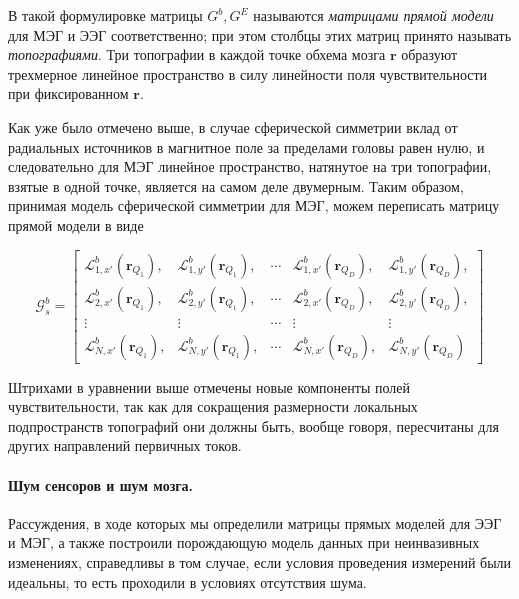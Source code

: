 В такой формулировке матрицы $G^b, G^E$ называются \emph{матрицами прямой модели} для МЭГ и ЭЭГ соответственно;
при этом столбцы этих матриц принято называть \emph{топографиями}. Три топографии в каждой точке обхема мозга $\mathbf{r}$
образуют трехмерное линейное пространство в силу линейности поля чувствительности при фиксированном $\mathbf{r}$.

Как уже было отмечено выше, в случае сферической симметрии вклад от радиальных источников в магнитное поле за пределами головы
равен нулю, и следовательно для МЭГ линейное пространство, натянутое на три топографии, взятые в одной точке, является
на самом деле двумерным. Таким образом, принимая модель сферической симметрии для МЭГ, можем переписать матрицу прямой модели в виде

\begin{equation}
    \mathcal{G}^b_{s} =
    \begin{bmatrix}
        \mathcal{L}_{1,x'}^b(\mathbf{r}_{Q_1}), & \mathcal{L}_{1,y'}^b(\mathbf{r}_{Q_1}), &
        \cdots &
        \mathcal{L}_{1,x'}^b(\mathbf{r}_{Q_D}), & \mathcal{L}_{1,y'}^b(\mathbf{r}_{Q_D}), \\
        \mathcal{L}_{2,x'}^b(\mathbf{r}_{Q_1}), & \mathcal{L}_{2,y'}^b(\mathbf{r}_{Q_1}), &
        \cdots &
        \mathcal{L}_{2,x'}^b(\mathbf{r}_{Q_D}), & \mathcal{L}_{2,y'}^b(\mathbf{r}_{Q_D}), \\
        \vdots                                    & \vdots                                    &
        \cdots &
        \vdots                                    & \vdots                                    \\
        \mathcal{L}_{N,x'}^b(\mathbf{r}_{Q_1}), & \mathcal{L}_{N,y'}^b(\mathbf{r}_{Q_1}), &
        \cdots &
        \mathcal{L}_{N,x'}^b(\mathbf{r}_{Q_D}), & \mathcal{L}_{N,y'}^b(\mathbf{r}_{Q_D})
    \end{bmatrix}
\end{equation}

Штрихами в уравнении выше отмечены новые компоненты полей чувствительности, так как для сокращения размерности
локальных подпространств топографий они должны быть, вообще говоря,
пересчитаны для других направлений первичных токов.

\paragraph{Шум сенсоров и шум мозга.}
Рассуждения, в ходе которых мы определили матрицы прямых моделей для ЭЭГ и МЭГ, а также
построили порождающую модель данных при неинвазивных изменениях, справедливы в том случае, если
условия проведения измерений были идеальны, то есть проходили в условиях отсутствия шума.

